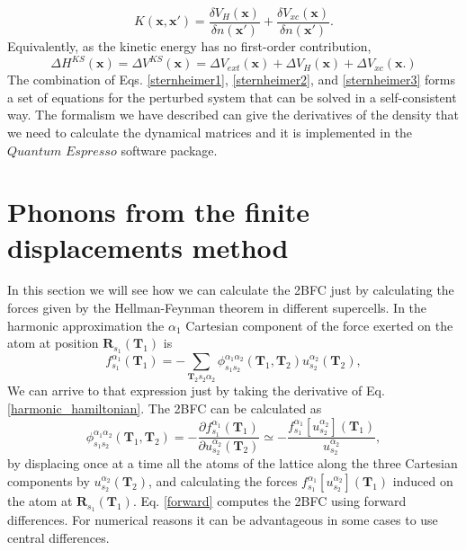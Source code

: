 \begin{equation}
 K(\mathbf{x},\mathbf{x}')=\frac{\delta V_{H}(\mathbf{x})}{\delta n(\mathbf{x}')}+\frac{\delta V_{xc}(\mathbf{x})}{\delta n(\mathbf{x}')}.
\end{equation}
Equivalently, as the kinetic energy has no first-order contribution,
\begin{equation}
 \Delta H^{KS}(\mathbf{x})=\Delta V^{KS}(\mathbf{x})=\Delta V_{ext}(\mathbf{x})+\Delta V_{H}(\mathbf{x})+\Delta V_{xc}(\mathbf{x}.)
\end{equation}
The combination of Eqs. \ref{sternheimer1}, \ref{sternheimer2}, and \ref{sternheimer3} forms a set of equations for the perturbed system that can be solved in a self-consistent way. The formalism we have 
described can give the derivatives of the density that we need to calculate the dynamical matrices and it is implemented in the $Quantum$ $Espresso$ software package\cite{giannozzi2009quantum}.

\section{Phonons from the finite displacements method}
\label{finite_displacement}

In this section we will see how we can calculate the 2BFC just by calculating the forces given by the 
Hellman-Feynman theorem in different supercells. In the harmonic approximation the $\alpha_{1}$ Cartesian component 
of the force exerted on the atom at position 
$\mathbf{R}_{s_{1}}(\mathbf{T}_{1})$ is 
\begin{equation}
f_{s_{1}}^{\alpha_{1}}(\mathbf{T}_{1})=-\sum_{\mathbf{T}_{2}s_{2}\alpha_{2}}\phi_{s_{1}s_{2}}^{\alpha_{1}\alpha_{2}}(
\mathbf{T}_{1},\mathbf{T}_{2})u_{s_{2}}^{\alpha_{2}}(\mathbf{T}_{2}),
 \label{forces_formula}
\end{equation}
We can arrive to that expression just by taking the derivative of Eq. \ref{harmonic_hamiltonian}. The 2BFC can be 
calculated as
\begin{equation}
	\phi_{s_{1}s_{2}}^{\alpha_{1}\alpha_{2}}(\mathbf{T}_{1},\mathbf{T}_{2})=-\frac{\partial f_{s_{1}}^{\alpha_{1}}(\mathbf{T}_{1})}{\partial u_{s_{2}}^{\alpha_{2}}(\mathbf{T}_{2})}\simeq -\frac{f_{s_{1}}^{\alpha_{1}}[u_{s_{2}}^{\alpha_{2}}](\mathbf{T}_{1})}{u_{s_{2}}^{\alpha_{2}}},
 \label{forward}
\end{equation}
by displacing once at a time all the atoms of the lattice along the three Cartesian components by 
$u_{s_{2}}^{\alpha_{2}}(\mathbf{T}_{2})$, and calculating the forces 
$f_{s_{1}}^{\alpha_{1}}[u_{s_{2}}^{\alpha_{2}}](\mathbf{T}_{1})$ induced on the atom at $\mathbf{R}_{s_{1}}(\mathbf{T}_{1})$. Eq. \ref{forward} computes the 2BFC using forward differences. For numerical reasons it can be advantageous in some cases to use central differences. \\

